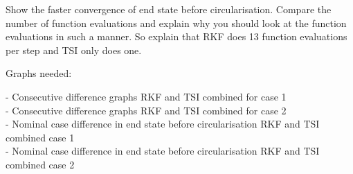 Show the faster convergence of end state before circularisation.
Compare the number of function evaluations and explain why you should look at the function evaluations in such a manner. So explain that RKF does 13 function evaluations per step and TSI only does one.

Graphs needed:

- Consecutive difference graphs RKF and TSI combined for case 1 \\
- Consecutive difference graphs RKF and TSI combined for case 2 \\
- Nominal case difference in end state before circularisation RKF and TSI combined case 1 \\
- Nominal case difference in end state before circularisation RKF and TSI combined case 2 \\


